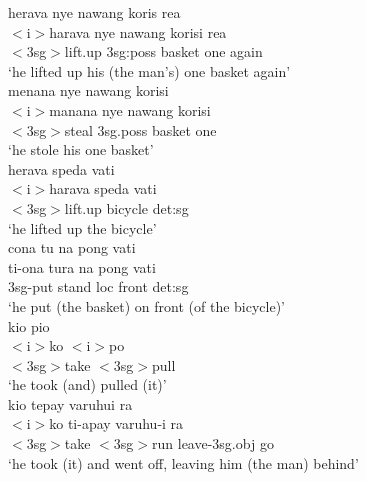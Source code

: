 \pex \label{Wooi_Abra1}
\ea
\gll herava nye nawang koris rea \\
$<$i$>$harava nye nawang korisi rea \\
\glc $<$\acs{3}\acs{sg}$>$lift.up \acs{3}\acs{sg}:\acs{poss} basket one again\\
\glft `he lifted up his (the man's) one basket again'\\
\z
\ea
\gll menana nye nawang korisi\\
$<$i$>$manana nye nawang korisi \\
\glc $<$\acs{3}\acs{sg}$>$steal \acs{3}\acs{sg}.\acs{poss} basket one\\
\glft `he stole his one basket'\\
\z
\ea
\gll herava speda vati\\
$<$i$>$harava speda vati \\
\glc $<$\acs{3}\acs{sg}$>$lift.up bicycle \acs{det}:\acs{sg}\\
\glft `he lifted up the bicycle'\\
\z
\ea
\gll cona tu na pong vati\\
ti-ona tura na pong vati \\
\glc \acs{3}\acs{sg}-put stand \acs{loc} front \acs{det}:\acs{sg}\\
\glft `he put (the basket) on front (of the bicycle)'\\
\z
\ea
\gll kio pio\\
$<$i$>$ko $<$i$>$po \\
\glc $<$\acs{3}\acs{sg}$>$take $<$\acs{3}\acs{sg}$>$pull\\
\glft `he took (and) pulled (it)'\\
\z
\ea
\gll kio tepay varuhui ra\\
$<$i$>$ko ti-apay varuhu-i ra \\
\glc $<$3sg$>$take $<$3sg$>$run leave-\acs{3}\acs{sg}.\acs{obj} go\\
\glft `he took (it) and went off, leaving him (the man) behind' \ 
\z
\xe

